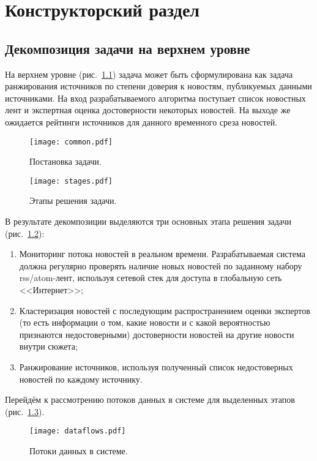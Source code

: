 \chapter{Конструкторский раздел}
\section{Декомпозиция задачи на верхнем уровне}
На верхнем уровне (рис.~\ref{fig:common}) задача может быть сформулирована как задача ранжирования источников по степени доверия к новостям, публикуемых данными источниками. На вход разрабатываемого алгоритма поступает список новостных лент и экспертная оценка достоверности некоторых новостей. На выходе же ожидается рейтинги источников для данного временного среза новостей.

\begin{figure}[h]
    \centering
    \texttt{[image: common.pdf]}
    \caption{Постановка задачи.}
    \label{fig:common}
\end{figure}

\begin{figure}[h]
    \centering
    \texttt{[image: stages.pdf]}
    \caption{Этапы решения задачи.}
    \label{fig:stages}
\end{figure}

В результате декомпозиции выделяются три основных этапа решения задачи (рис.~\ref{fig:stages}):
\begin{enumerate}
    \item Мониторинг потока новостей в реальном времени. Разрабатываемая система должна регулярно проверять наличие новых новостей по заданному набору rss/atom-лент, используя сетевой стек для доступа в глобальную сеть <<Интернет>>;
    \item Кластеризация новостей с последующим распространением оценки экспертов (то есть информации о том, какие новости и с какой вероятностью признаются недостоверными) достоверности новостей на другие новости внутри сюжета;
    \item Ранжирование источников, используя полученный список недостоверных новостей по каждому источнику.
\end{enumerate}

Перейдём к рассмотрению потоков данных в системе для выделенных этапов (рис.~\ref{fig:dataflows}).
\begin{figure}[h]
    \centering
    \texttt{[image: dataflows.pdf]}
    \caption{Потоки данных в системе.}
    \label{fig:dataflows}
\end{figure}

